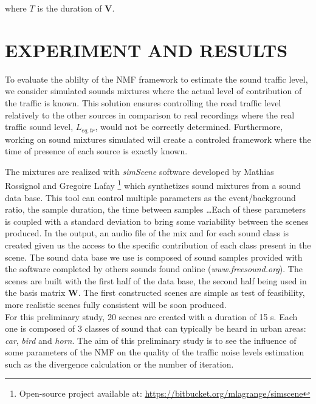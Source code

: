 \documentclass{article}
\begin{document}
\begin{sloppy}
where $T$ is the duration of $\mathbf{V}$.\\

\section{EXPERIMENT AND RESULTS}\label{sec:experiment}

To evaluate the ablilty of the NMF framework to estimate the sound traffic level, we consider simulated sounds mixtures where the actual level of contribution of the traffic is known. This solution ensures controlling the road traffic level relatively to the other sources in comparison to real recordings where the real traffic sound level, $L_{eq,tr}$, would not be correctly determined. Furthermore, working on sound mixtures simulated will create a controled framework where the time of presence of each source is exactly known.

The mixtures are realized with \textit{simScene} software developed by Mathias Rossignol and Gregoire Lafay \cite{simScene} \footnote{Open-source project available at: \url{https://bitbucket.org/mlagrange/simscene}} which synthetizes sound mixtures from a sound data base. This tool can control multiple parameters as the event/background ratio, the sample duration, the time between samples \dots Each of these parameters is coupled with a standard deviation to bring some variability between the scenes produced. In the output, an audio file of the mix and for each sound class is created given us the access to the specific contribution of each class present in the scene. The sound data base we use is composed of sound samples provided with the software completed by others sounds found online (\textit{www.freesound.org}). The scenes are built with the first half of the data base, the second half being used in the basis matrix $\mathbf{W}$. The first constructed scenes are simple as test of feasibility, more realistic scenes fully consistent will be soon produced.\\

For this preliminary study, 20 scenes are created with a duration of 15 s. Each one is composed of 3 classes of sound that can typically be heard in urban areas: \textit{car}, \textit{bird} and \textit{horn}. The aim of this preliminary study is to see the influence of some parameters of the NMF on the quality of the traffic noise levels estimation such as the divergence calculation or the number of iteration.\\


\end{sloppy}
\end{document}
